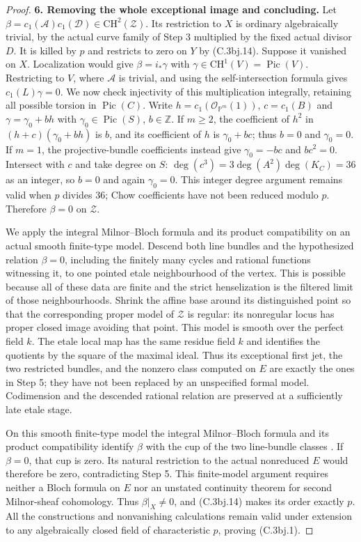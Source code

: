 \begin{proof}
\textbf{6. Removing the whole exceptional image and concluding.}
Let $\beta=c_1(\mathcal A)c_1(\mathcal D)\in\mathrm{CH}^2(\mathcal Z)$.
Its restriction to $X$ is ordinary algebraically trivial, by the actual
curve family of Step 3 multiplied by the fixed actual divisor $D$.
It is killed by $p$ and restricts to zero on $Y$ by (C.3bj.14).
Suppose it vanished on $X$. Localization would give
$\beta=i_*\gamma$ with $\gamma\in\mathrm{CH}^1(V)=\operatorname{Pic}(V)$.
Restricting to $V$, where $\mathcal A$ is trivial, and using the
self-intersection formula gives $c_1(L)\gamma=0$.
We now check injectivity of this multiplication integrally, retaining
all possible torsion in $\operatorname{Pic}(C)$.
Write $h=c_1(\mathcal O_{\mathbb P^m}(1))$, $c=c_1(B)$ and
$\gamma=\gamma_0+bh$ with $\gamma_0\in\operatorname{Pic}(S)$,
$b\in\mathbb Z$. If $m\ge2$, the coefficient of $h^2$ in
$(h+c)(\gamma_0+bh)$ is $b$, and its coefficient of $h$ is
$\gamma_0+bc$; thus $b=0$ and $\gamma_0=0$.
If $m=1$, the projective-bundle coefficients instead give
$\gamma_0=-bc$ and $bc^2=0$. Intersect with $c$ and take degree on
$S$: $\deg(c^3)=3\deg(A^2)\deg(K_C)=36$ as an integer, so $b=0$
and again $\gamma_0=0$. This integer degree argument remains valid
when $p$ divides $36$; Chow coefficients have not been reduced modulo $p$.
Therefore $\beta=0$ on $\mathcal Z$.

We apply the integral Milnor--Bloch formula and its product
compatibility on an actual smooth finite-type model. Descend both
line bundles and the hypothesized relation $\beta=0$, including the
finitely many cycles and rational functions witnessing it, to one
pointed etale neighbourhood of the vertex. This is possible because
all of these data are finite and the strict henselization is the
filtered limit of those neighbourhoods. Shrink the affine base around
its distinguished point so that the corresponding proper model of
$\mathcal Z$ is regular: its nonregular locus has proper closed image
avoiding that point. This model is smooth over the perfect field $k$.
The etale local map has the same residue field $k$ and identifies the
quotients by the square of the maximal ideal. Thus its exceptional
first jet, the two restricted bundles, and the nonzero class computed
on $E$ are exactly the ones in Step 5; they have not been replaced by
an unspecified formal model. Codimension and the descended rational
relation are preserved at a sufficiently late etale stage.

On this smooth finite-type model the integral Milnor--Bloch formula
and its product compatibility identify $\beta$ with the cup of the
two line-bundle classes
\citep[Theorems 7.1 and 7.5, author pp.~21--22]{cyKerz2009Milnor}
\citep[Section 3, diagram (22), pp.~557--558]{cyBraunling2013}.
If $\beta=0$, that cup is zero. Its natural restriction to the actual
nonreduced $E$ would therefore be zero, contradicting Step 5.
This finite-model argument requires neither a Bloch formula on $E$
nor an unstated continuity theorem for second Milnor-sheaf cohomology.
Thus $\beta|_X\ne0$, and (C.3bj.14) makes its order exactly $p$.
All the constructions and nonvanishing calculations remain valid
under extension to any algebraically closed field of characteristic
$p$, proving (C.3bj.1).
\end{proof}


